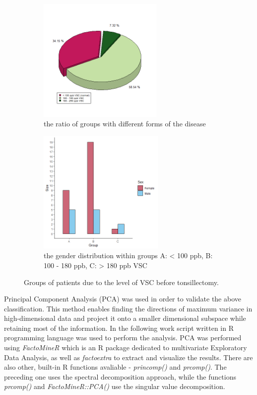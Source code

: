 \documentclass[12pt,a4paper,notitlepage]{report}
\begin{document}
\begin{figure}[H]
	\centering
	\begin{subfigure}[b]{.5\textwidth}
	\centering
		\includegraphics[width=\linewidth, height=6cm]{./Figures/Fig_2.1a} 
		\caption{the ratio of groups with different \newline forms of the disease}
		\label{fig:Fig_2.1a}
	\end{subfigure}\hfill
	\begin{subfigure}[b]{.5\textwidth}
	\centering
		\includegraphics[width=\linewidth, height=6cm]{./Figures/Fig_2.1b}
		\caption{the gender distribution within groups A: < 100 ppb,  B: 100 - 180 ppb, C: > 180 ppb VSC}
		\label{fig:Fig_2.1b}
	\end{subfigure}

	\caption{Groups of patients due to the level of VSC before tonsillectomy.}
	\label{fig:Fig_2.1}
\end{figure}


Principal Component Analysis (PCA) was used in order to validate the above classification. This method enables finding the directions of maximum variance in high-dimensional data and project it onto a smaller dimensional subspace while retaining most of the information. In the following work script written in R programming language was used to perform the analysis. PCA was performed using \textit{FactoMineR} which is an R package dedicated to multivariate Exploratory Data Analysis, as well as \textit{factoextra} to extract and visualize the results. There are also other, built-in R functions avaliable - \textit{princomp()} and \textit{prcomp()}. The preceding one uses the spectral decomposition approach, while the functions \textit{prcomp()} and  \textit{FactoMineR::PCA()} use the singular value decomposition.
\end{document}

